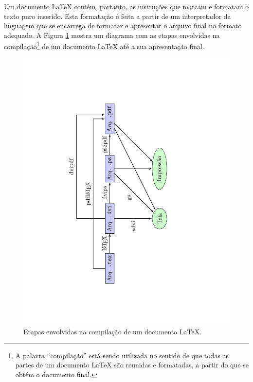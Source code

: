 Um documento \LaTeX{} contém, portanto, as instruções que marcam e formatam o texto puro inserido. Esta formatação é feita a partir de um interpretador da linguagem que se encarrega de formatar e apresentar o arquivo final no formato adequado. A Figura \ref{fig:complatex} mostra um diagrama com as etapas envolvidas na compilação\footnote{A palavra ``compilação'' está sendo utilizada no sentido de que todas as partes de um documento \LaTeX{} são reunidas e formatadas, a partir do que se obtém o documento final.} de um documento \LaTeX{} até a sua apresentação final.

\begin{figure}[H]
\caption{Etapas envolvidas na compilação de um documento \LaTeX{}.}
\vspace{6mm}
    \begin{center}
        \includegraphics[scale=0.6,angle=-90,trim={4.5cm 1cm 6cm 1cm},clip]{./docs/figs/diagramacomp2.pdf}
    \end{center}
\vspace{4mm}
\label{fig:complatex}
\end{figure}

